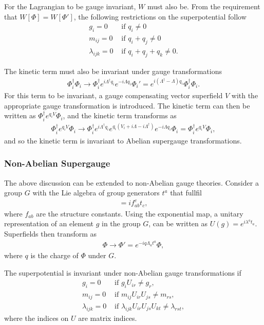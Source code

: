 \documentclass[twoside,english]{uiofysmaster}
\begin{document}
For the Lagrangian to be gauge invariant, $W$ must also be. From the requirement that $W[\Phi] = W[\Phi']$, the following restrictions on the superpotential follow
\begin{align}
g_i  = 0&\text{ if } q_i \neq 0\\
m_{ij} = 0 & \text{ if } q_i + q_j \neq 0\\
\lambda_{ijk} = 0 & \text{ if } q_i + q_j + q_k \neq 0. 
\end{align}

The kinetic term must also be invariant under gauge transformations
\begin{align}
\Phi_i^{\dagger} \Phi_i \rightarrow \Phi_i^{ \dagger}e^{i \Lambda^{\dagger} q_i} e^{-i \Lambda q_i}\Phi_i' = e^{i(\Lambda^{\dagger} - \Lambda)q_i} \Phi_i^{\dagger} \Phi_i.
\end{align}
For this term to be invariant, a gauge compensating vector superfield $V$ with the appropriate gauge transformation is introduced. The kinetic term can then be written as $\Phi_i^{\dagger} e^{q_iV} \Phi_i$, and the kinetic term transforms as
\begin{align}
\Phi_i^{\dagger} e^{q_iV} \Phi_i \rightarrow \Phi^{\dagger}_i e^{i \Lambda^{\dagger}q_i} e^{q_i(V_i + i \Lambda - i \Lambda^{\dagger})} e^{-i \Lambda q_i} \Phi_i = \Phi_i^{\dagger} e^{q_iV} \Phi_i,
\end{align}
and so the kinetic term is invariant to Abelian supergauge transformations.

\subsubsection{Non-Abelian Supergauge}

The above discussion can be extended to non-Abelian gauge theories. Consider a group $G$ with the Lie algebra of group generators $t^a$ that fullfil
\begin{align}
[t_a, t_b] = i f_{ab}^c t_c,
\end{align}
where $f_{ab}$ are the structure constants. Using the exponential map, a unitary representation of an element $g$ in the group $G$, can be written as $U(g)= e^{i \lambda^a t_a}$. Superfields then transform as
\begin{align}
\Phi \rightarrow \Phi' = e^{-i q \Lambda_a t^a} \Phi,
\end{align}
where $q$ is the charge of $\Phi$ under $G$. 

The superpotential is invariant under non-Abelian gauge transformations if
\begin{align}
g_i = 0 &\text{ if } g_i U_{ir} \neq g_r,\\
m_{ij} = 0 &\text{ if } m_{ij} U_{ir} U_{js} \neq m_{rs},\\
\lambda_{ijk} = 0 &\text{ if } \lambda_{ijk}U_{ir}U_{js}U_{kt} \neq \lambda_{rst},
\end{align} 
where the indices on $U$ are matrix indices. 
\end{document}
